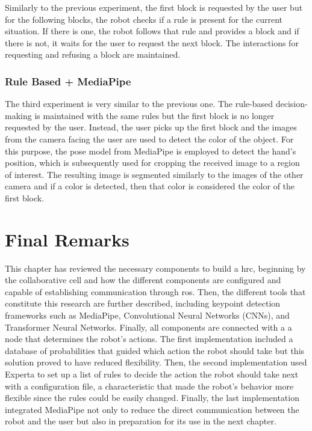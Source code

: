 Similarly to the previous experiment, the first block is requested by the user but for the following blocks, the robot checks if a rule is present for the current situation. If there is one, the robot follows that rule and provides a block and if there is not, it waits for the user to request the next block. The interactions for requesting and refusing a block are maintained.

\subsubsection{Rule Based + MediaPipe}

The third experiment is very similar to the previous one. The rule-based decision-making is maintained with the same rules but the first block is no longer requested by the user. Instead, the user picks up the first block and the images from the camera facing the user are used to detect the color of the object. For this purpose, the pose model from MediaPipe is employed to detect the hand's position, which is subsequently used for cropping the received image to a region of interest. The resulting image is segmented similarly to the images of the other camera and if a color is detected, then that color is considered the color of the first block.

\section{Final Remarks}
\label{section:materials_methods_final_remarks}

This chapter has reviewed the necessary components to build a \acf{hrc}, beginning by the collaborative cell and how the different components are configured and capable of establishing communication through \acs{ros}. Then, the different tools that constitute this research are further described, including keypoint detection frameworks such as MediaPipe, Convolutional Neural Networks (CNNs), and Transformer Neural Networks. Finally, all components are connected with a a node that determines the robot's actions. The first implementation included a database of probabilities that guided which action the robot should take but this solution proved to have reduced flexibility. Then, the second implementation used Experta to set up a list of rules to decide the action the robot should take next with a configuration file, a characteristic that made the robot's behavior more flexible since the rules could be easily changed. Finally, the last implementation integrated MediaPipe not only to reduce the direct communication between the robot and the user but also in preparation for its use in the next chapter.